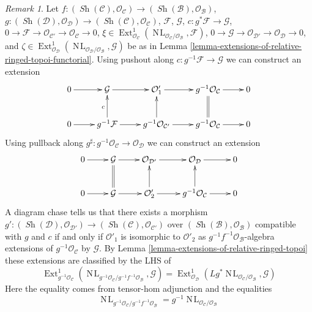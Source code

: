 \documentclass{stacks-project}
\theoremstyle{plain}
\theoremstyle{definition}
\theoremstyle{remark}
\newtheorem{remark}[subsection]{Remark}
\numberwithin{equation}{subsection}
\def\Ext{\mathop{\mathrm{Ext}}\nolimits}
\def\Sh{\mathop{\mathit{Sh}}\nolimits}
\def\NL{\mathop{N\!L}\nolimits}
\begin{document}
\begin{remark}
\label{remark-extensions-of-relative-ringed-topoi-functorial}
Let $f : (\Sh(\mathcal{C}), \mathcal{O}_\mathcal{C}) \to
(\Sh(\mathcal{B}), \mathcal{O}_\mathcal{B})$,
$g : (\Sh(\mathcal{D}), \mathcal{O}_\mathcal{D}) \to
(\Sh(\mathcal{C}), \mathcal{O}_\mathcal{C})$,
$\mathcal{F}$,
$\mathcal{G}$,
$c : g^*\mathcal{F} \to \mathcal{G}$,
$0 \to \mathcal{F} \to \mathcal{O}_{\mathcal{C}'} \to
\mathcal{O}_\mathcal{C} \to 0$,
$\xi \in \Ext^1_{\mathcal{O}_\mathcal{C}}(
\NL_{\mathcal{O}_\mathcal{C}/\mathcal{O}_\mathcal{B}}, \mathcal{F})$,
$0 \to \mathcal{G} \to \mathcal{O}_{\mathcal{D}'} \to
\mathcal{O}_\mathcal{D} \to 0$, and
$\zeta \in \Ext^1_{\mathcal{O}_\mathcal{D}}(
\NL_{\mathcal{O}_\mathcal{D}/\mathcal{O}_\mathcal{B}}, \mathcal{G})$
be as in Lemma \ref{lemma-extensions-of-relative-ringed-topoi-functorial}.
Using pushout along $c : g^{-1}\mathcal{F} \to \mathcal{G}$
we can construct an extension
$$
\xymatrix{
0 \ar[r] &
\mathcal{G} \ar[r] &
\mathcal{O}'_1 \ar[r] &
g^{-1}\mathcal{O}_\mathcal{C} \ar[r] & 0 \\
0 \ar[r] &
g^{-1}\mathcal{F} \ar[u]^c \ar[r] &
g^{-1}\mathcal{O}_{\mathcal{C}'} \ar[u] \ar[r] &
g^{-1}\mathcal{O}_\mathcal{C} \ar@{=}[u] \ar[r] & 0
}
$$
Using pullback along
$g^\sharp : g^{-1}\mathcal{O}_\mathcal{C} \to \mathcal{O}_\mathcal{D}$
we can construct an extension
$$
\xymatrix{
0 \ar[r] &
\mathcal{G} \ar[r] &
\mathcal{O}_{\mathcal{D}'} \ar[r] &
\mathcal{O}_\mathcal{D} \ar[r] & 0 \\
0 \ar[r] &
\mathcal{G} \ar@{=}[u] \ar[r] &
\mathcal{O}'_2 \ar[u] \ar[r] &
g^{-1}\mathcal{O}_\mathcal{C} \ar[u] \ar[r] & 0
}
$$
A diagram chase tells us that there exists a morphism
$g' : (\Sh(\mathcal{D}), \mathcal{O}_{\mathcal{D}'}) \to
(\Sh(\mathcal{C}), \mathcal{O}_{\mathcal{C}'})$
over $(\Sh(\mathcal{B}), \mathcal{O}_\mathcal{B})$
compatible with $g$ and $c$ if and only if $\mathcal{O}'_1$ is isomorphic
to $\mathcal{O}'_2$ as $g^{-1}f^{-1}\mathcal{O}_\mathcal{B}$-algebra extensions
of $g^{-1}\mathcal{O}_\mathcal{C}$ by $\mathcal{G}$. By
Lemma \ref{lemma-extensions-of-relative-ringed-topoi}
these extensions are classified by the LHS of
$$
\Ext^1_{g^{-1}\mathcal{O}_\mathcal{C}}(
\NL_{g^{-1}\mathcal{O}_\mathcal{C}/g^{-1}f^{-1}\mathcal{O}_\mathcal{B}},
\mathcal{G}) =
\Ext^1_{\mathcal{O}_\mathcal{D}}(
Lg^*\NL_{\mathcal{O}_\mathcal{C}/\mathcal{O}_\mathcal{B}}, \mathcal{G})
$$
Here the equality comes from tensor-hom adjunction and
the equalities
$$
\NL_{g^{-1}\mathcal{O}_\mathcal{C}/g^{-1}f^{-1}\mathcal{O}_\mathcal{B}} =
g^{-1}\NL_{\mathcal{O}_\mathcal{C}/\mathcal{O}_\mathcal{B}}
$$
\end{remark}
\end{document}
